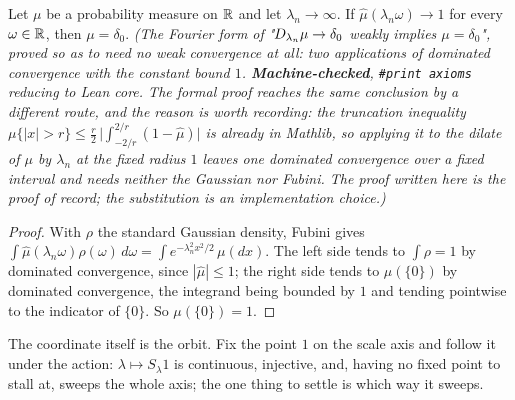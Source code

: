 \begin{lemma}\label{lem:dilation-atom}
\leanok
Let $\mu$ be a probability measure on $\mathbb{R}$ and let $\lambda_n \to \infty$. If
$\hat\mu(\lambda_n\omega) \to 1$ for every $\omega \in \mathbb{R}$, then $\mu = \delta_0$.
\statusT\quad\emph{(The Fourier form of "$D_{\lambda_n}\mu \to \delta_0$ weakly implies
$\mu = \delta_0$", proved so as to need no weak convergence at all: two applications of
dominated convergence with the constant bound $1$. \textbf{Machine-checked},
\texttt{\#print axioms} reducing to Lean core. The formal proof reaches the same conclusion by
a different route, and the reason is worth recording: the truncation inequality
$\mu\{|x| > r\} \le \tfrac r2\,\bigl|\int_{-2/r}^{2/r}(1 - \hat\mu)\bigr|$ is already in
Mathlib, so applying it to the dilate of $\mu$ by $\lambda_n$ at the fixed radius $1$ leaves
one dominated convergence over a fixed interval and needs neither the Gaussian nor Fubini. The
proof written here is the proof of record; the substitution is an implementation choice.)}
\end{lemma}

\begin{proof}
\leanok
With $\rho$ the standard Gaussian density, Fubini gives
$\int \hat\mu(\lambda_n\omega)\rho(\omega)\,d\omega = \int e^{-\lambda_n^2x^2/2}\,\mu(dx)$. The
left side tends to $\int\rho = 1$ by dominated convergence, since $|\hat\mu| \le 1$; the right
side tends to $\mu(\{0\})$ by dominated convergence, the integrand being bounded by $1$ and
tending pointwise to the indicator of $\{0\}$. So $\mu(\{0\}) = 1$.
\end{proof}

The coordinate itself is the orbit. Fix the point $1$ on the scale axis and follow it under the
action: $\lambda \mapsto S_\lambda 1$ is continuous, injective, and, having no fixed point to
stall at, sweeps the whole axis; the one thing to settle is which way it sweeps.

